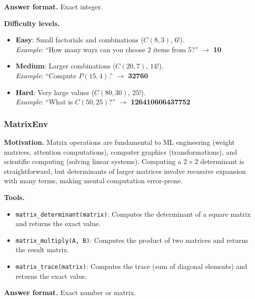 \textbf{Answer format.} Exact integer.

\textbf{Difficulty levels.}
\begin{itemize}
    \item \textbf{Easy}: Small factorials and combinations ($C(8,3)$, $6!$).\\
    \emph{Example}: ``How many ways can you choose 2 items from 5?'' $\to$ \textbf{10}
    \item \textbf{Medium}: Larger combinations ($C(20,7)$, $14!$).\\
    \emph{Example}: ``Compute $P(15,4)$.'' $\to$ \textbf{32760}
    \item \textbf{Hard}: Very large values ($C(80,30)$, $25!$).\\
    \emph{Example}: ``What is $C(50,25)$?'' $\to$ \textbf{126410606437752}
\end{itemize}

\subsubsection{MatrixEnv}

\textbf{Motivation.}
Matrix operations are fundamental to ML engineering (weight matrices, attention computations), computer graphics (transformations), and scientific computing (solving linear systems). Computing a $2\times2$ determinant is straightforward, but determinants of larger matrices involve recursive expansion with many terms, making mental computation error-prone.

\textbf{Tools.}
\begin{itemize}
    \item \texttt{matrix\_determinant(matrix)}: Computes the determinant of a square matrix and returns the exact value.
    \item \texttt{matrix\_multiply(A, B)}: Computes the product of two matrices and returns the result matrix.
    \item \texttt{matrix\_trace(matrix)}: Computes the trace (sum of diagonal elements) and returns the exact value.
\end{itemize}

\textbf{Answer format.} Exact number or matrix.


